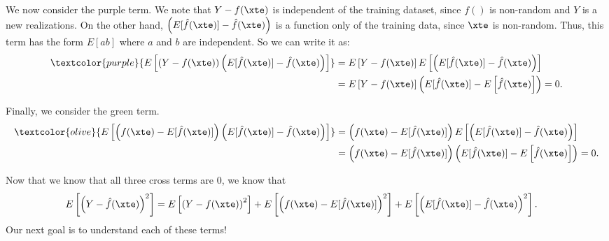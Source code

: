 {We now consider the purple term. We note that $Y-f(\xte)$ is independent of the training dataset, since $f()$ is non-random and $Y$ is a new realizations. On the other hand, $\left(E[\hat{f}(\xte)] -  \hat{f}(\xte)\right)$ is a function only of the training data, since $\xte$ is non-random. Thus, this term has the form $E[ab]$ where $a$ and $b$ are independent. So we can write it as: 
\begin{align*}
 \textcolor{purple}{E\left[\left(Y -f(\xte)\right) \left(E[\hat{f}(\xte)] -  \hat{f}(\xte)\right)\right]} &= 	E\left[ Y -f(\xte)\right] E\left[\left(E[\hat{f}(\xte)] -  \hat{f}(\xte)\right)\right] \\
 &= E\left[ Y -f(\xte)\right] \left(E[\hat{f}(\xte)] -   E\left[\hat{f}(\xte)\right] \right) = 0. \\
\end{align*}

Finally, we consider the green term. 
\begin{align*}
\textcolor{olive}{E\left[\left(f(\xte) - E[\hat{f}(\xte)]\right) \left(E[\hat{f}(\xte)] -  \hat{f}(\xte)\right)\right]} &= \left(f(\xte) - E[\hat{f}(\xte)]\right) E\left[ \left(E[\hat{f}(\xte)] -  \hat{f}(\xte)\right)\right] \\
&= \left(f(\xte) - E[\hat{f}(\xte)]\right) \left(E[\hat{f}(\xte)] -   E\left[ \hat{f}(\xte) \right]\right) = 0. 
\end{align*}

Now that we know that all three cross terms are $0$, we know that 
\begin{align*}
 E\left[\left(Y - \hat{f}(\xte)\right)^2 \right] &= E\left[\left(Y -f(\xte)\right)^2\right] + E\left[\left(f(\xte) - E[\hat{f}(\xte)]\right)^2\right] + E\left[\left(E[\hat{f}(\xte)] -  \hat{f}(\xte)\right)^2\right]. 
\end{align*}
Our next goal is to understand each of these terms! 

}
